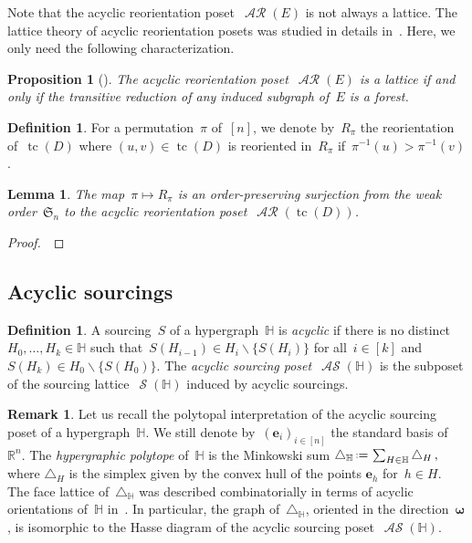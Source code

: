 \documentclass{amsart}
\newtheorem{proposition}[theorem]{Proposition}
\newtheorem{lemma}[theorem]{Lemma}
\theoremstyle{definition}
\newtheorem{definition}[theorem]{Definition}
\newtheorem{remark}[theorem]{Remark}
\newcommand{\R}{\mathbb{R}} %
\renewcommand{\b}[1]{\boldsymbol{#1}} %
\renewcommand{\c}[1]{\mathcal{#1}} %
\newcommand{\ssm}{\smallsetminus} %
\newcommand{\eqdef}{\mbox{\,\raisebox{0.2ex}{\scriptsize\ensuremath{\mathrm:}}\ensuremath{=}\,}} %
\newcommand{\simplex}{\triangle} %
\DeclareMathOperator{\tc}{tc} %
\newcommand{\darkblue}{\color{darkblue}} %
\newcommand{\defn}[1]{\textsl{\darkblue #1}} %
\newcommand{\vincent}[1]{\todo[size=\tiny,color=blue!30]{ #1 \\ \hfill --- V.}\,}
\newcommand{\fS}{\mathfrak{S}} %
\DeclareMathOperator{\AReori}{\c{AR}}  %
\DeclareMathOperator{\Sour}{\mathcal{S}}  %
\DeclareMathOperator{\ASour}{\mathcal{AS}}  %
\newcommand{\HH}{\mathbb H}  %
\begin{document}
Note that the acyclic reorientation poset~$\AReori(E)$ is not always a lattice.
The lattice theory of acyclic reorientation posets was studied in details in~\cite{Pilaud-acyclicReorientationLattices}.
Here, we only need the following characterization.

\begin{proposition}[{\cite[Thm.~1]{Pilaud-acyclicReorientationLattices}}]
The acyclic reorientation poset~$\AReori(E)$ is a lattice if and only if the transitive reduction of any induced subgraph of~$E$ is a forest.
\end{proposition}

\begin{definition}
For a permutation~$\pi$ of~$[n]$, we denote by~$R_\pi$ the reorientation of~$\tc(D)$ where $(u,v) \in \tc(D)$ is reoriented in~$R_\pi$ if~$\pi^{-1}(u) > \pi^{-1}(v)$.
\end{definition}

\begin{lemma}
The map~$\pi \mapsto R_\pi$ is an order-preserving surjection from the weak order~$\fS_n$ to the acyclic reorientation poset~$\AReori(\tc(D))$.
\end{lemma}

\begin{proof}
\vincent{todo}
\end{proof}

\subsection{Acyclic sourcings}

\begin{definition}
A sourcing~$S$ of a hypergraph~$\HH$ is \defn{acyclic} if there is no distinct~$H_0, \dots, H_k \in \HH$ such that~$S(H_{i-1}) \in H_i \ssm \{S(H_i)\}$ for all~$i \in [k]$ and~$S(H_k) \in H_0 \ssm \{S(H_0)\}$.
The \defn{acyclic sourcing poset}~$\ASour(\HH)$ is the subposet of the sourcing lattice~$\Sour(\HH)$ induced by acyclic sourcings.
\end{definition}

\begin{remark}
Let us recall the polytopal interpretation of the acyclic sourcing poset of a hypergraph~$\HH$.
We still denote by~$(\b{e}_i)_{i \in [n]}$ the standard basis of~$\R^n$.
The \defn{hypergraphic polytope} of~$\HH$ is the Minkowski sum
\(
\simplex_\HH \eqdef \sum_{H\in \HH} \simplex_H\,,
\)
where $\simplex_H$ is the simplex given by the convex hull of the points $\b{e}_h$ for~$h \in H$.
The face lattice of~$\simplex_\HH$ was described combinatorially in terms of acyclic orientations of~$\HH$ in~\cite{BenedettiBergeronMachacek}.
In particular, the graph of~$\simplex_\HH$, oriented in the direction~$\b{\omega}$, is isomorphic to the Hasse diagram of the acyclic sourcing poset~$\ASour(\HH)$.
\end{remark}
\end{document}
